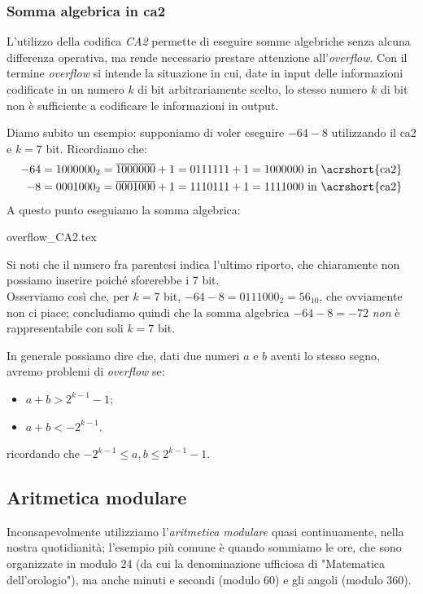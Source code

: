 \documentclass[class=book, crop=false, oneside]{standalone}
\begin{document}
\subsubsection{Somma algebrica in \acrfull{ca2}}
L'utilizzo della codifica \emph{CA2} permette di eseguire somme algebriche senza alcuna differenza operativa, ma rende necessario prestare attenzione all'\emph{overflow}. Con il termine \emph{overflow} si intende la situazione in cui, date in input delle informazioni codificate in un numero \(k\) di bit arbitrariamente scelto, lo stesso numero \(k\) di bit non è sufficiente a codificare le informazioni in output.

Diamo subito un esempio: supponiamo di voler eseguire \(-64-8\) utilizzando il \acrshort{ca2} e \(k=7\) bit. Ricordiamo che:
\begin{align*}
-64=1000000_{2}=\overline{1000000}+1=0111111+1=1000000 \text{ in \acrshort{ca2}}\\
-8=0001000_{2}=\overline{0001000}+1=1110111+1=1111000 \text{ in \acrshort{ca2}}
\end{align*}
A questo punto eseguiamo la somma algebrica:
\begin{table}[H]
	\centering
	{overflow_CA2.tex}
\end{table}
Si noti che il numero fra parentesi indica l'ultimo riporto, che chiaramente non possiamo inserire poiché sforerebbe i 7 bit.\\
Osserviamo così che, per \(k=7\) bit, \(-64-8=0111000_{2}=56_{10}\), che ovviamente non ci piace; concludiamo quindi che la somma algebrica \(-64-8=-72\) \emph{non} è rappresentabile con soli \(k=7\) bit.

In generale possiamo dire che, dati due numeri \(a\) e \(b\) aventi lo stesso segno, avremo problemi di \emph{overflow} se:
\begin{itemize}
	\item \(a+b>2^{k-1}-1\);
	\item \(a+b<-2^{k-1}\).
\end{itemize}
ricordando che \(-2^{k-1}\le a,b\le 2^{k-1}-1\).

\subsection{Aritmetica modulare}
Inconsapevolmente utilizziamo l'\emph{aritmetica modulare} quasi continuamente, nella nostra quotidianità; l'esempio più comune è quando sommiamo le ore, che sono organizzate in modulo 24 (da cui la denominazione ufficiosa di "Matematica dell'orologio"), ma anche minuti e secondi (modulo 60) e gli angoli (modulo 360).
\end{document}
